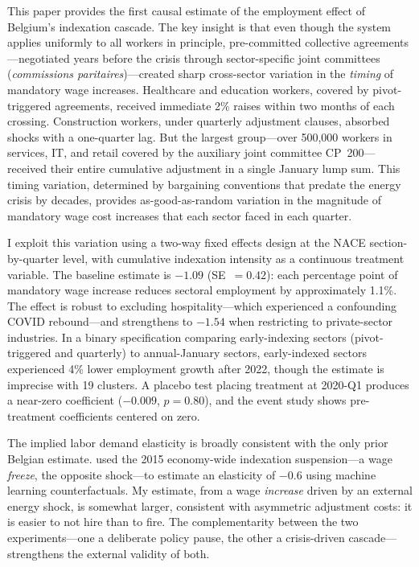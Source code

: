 \documentclass[12pt]{article}
\begin{document}
This paper provides the first causal estimate of the employment effect of Belgium's indexation cascade. The key insight is that even though the system applies uniformly to all workers in principle, pre-committed collective agreements---negotiated years before the crisis through sector-specific joint committees (\textit{commissions paritaires})---created sharp cross-sector variation in the \textit{timing} of mandatory wage increases. Healthcare and education workers, covered by pivot-triggered agreements, received immediate 2\% raises within two months of each crossing. Construction workers, under quarterly adjustment clauses, absorbed shocks with a one-quarter lag. But the largest group---over 500,000 workers in services, IT, and retail covered by the auxiliary joint committee CP~200---received their entire cumulative adjustment in a single January lump sum. This timing variation, determined by bargaining conventions that predate the energy crisis by decades, provides as-good-as-random variation in the magnitude of mandatory wage cost increases that each sector faced in each quarter.

I exploit this variation using a two-way fixed effects design at the NACE section-by-quarter level, with cumulative indexation intensity as a continuous treatment variable. The baseline estimate is $-1.09$ (SE~$= 0.42$): each percentage point of mandatory wage increase reduces sectoral employment by approximately 1.1\%. The effect is robust to excluding hospitality---which experienced a confounding COVID rebound---and strengthens to $-1.54$ when restricting to private-sector industries. In a binary specification comparing early-indexing sectors (pivot-triggered and quarterly) to annual-January sectors, early-indexed sectors experienced 4\% lower employment growth after 2022, though the estimate is imprecise with 19 clusters. A placebo test placing treatment at 2020-Q1 produces a near-zero coefficient ($-0.009$, $p = 0.80$), and the event study shows pre-treatment coefficients centered on zero.

The implied labor demand elasticity is broadly consistent with the only prior Belgian estimate. \citet{vandekerckhove2023} used the 2015 economy-wide indexation suspension---a wage \textit{freeze}, the opposite shock---to estimate an elasticity of $-0.6$ using machine learning counterfactuals. My estimate, from a wage \textit{increase} driven by an external energy shock, is somewhat larger, consistent with asymmetric adjustment costs: it is easier to not hire than to fire. The complementarity between the two experiments---one a deliberate policy pause, the other a crisis-driven cascade---strengthens the external validity of both.
\end{document}
